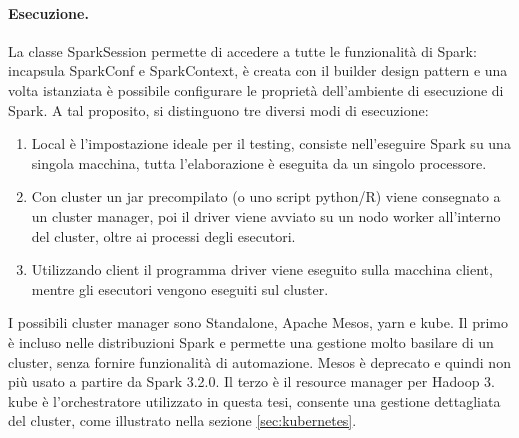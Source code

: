 \documentclass[12pt,a4paper,fleqn,titlepage]{report}
\begin{document}
        \paragraph{Esecuzione.}
        La classe SparkSession permette di accedere a tutte le funzionalità di Spark: incapsula SparkConf e SparkContext, è creata con il builder design pattern e una volta istanziata è possibile configurare le proprietà dell'ambiente di esecuzione di Spark.
        A tal proposito, si distinguono tre diversi modi di esecuzione:
        \begin{enumerate}
            \item Local è l'impostazione ideale per il testing, consiste nell'eseguire Spark su una singola macchina, tutta l'elaborazione è eseguita da un singolo processore.
            \item Con cluster un jar precompilato (o uno script python/R) viene consegnato a un cluster manager, poi il driver viene avviato su un nodo worker all'interno del cluster, oltre ai processi degli esecutori.
            \item Utilizzando client il programma driver viene eseguito sulla macchina client, mentre gli esecutori vengono eseguiti sul cluster.
        \end{enumerate}

        I possibili \gls{cluster} manager sono Standalone, Apache Mesos, \gls{yarn} e \gls{kube}. Il primo è incluso nelle distribuzioni Spark e permette una gestione molto basilare di un \gls{cluster}, senza fornire funzionalità di automazione. Mesos è deprecato e quindi non più usato a partire da Spark 3.2.0. Il terzo è il resource manager per Hadoop 3. \gls{kube} è l'orchestratore utilizzato in questa tesi, consente una gestione dettagliata del \gls{cluster}, come illustrato nella sezione \ref{sec:kubernetes}.
\end{document}
